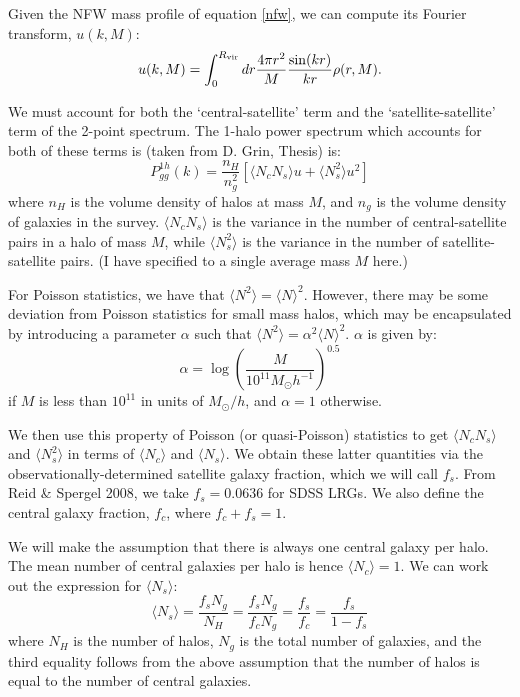 \documentclass[onecolumn,amsmath,aps,fleqn, superscriptaddress]{revtex4}
\begin{document}
Given the NFW mass profile of equation \ref{nfw}, we can compute its Fourier transform, $u(k, M)$:
\begin{equation}
u(k, M) = \int_0^{R_{\rm vir}} dr \frac{4 \pi r^2}{M}\frac{\sin(kr)}{kr}\rho(r, M).
\label{u}
\end{equation}

We must account for both the `central-satellite' term and the `satellite-satellite' term of the 2-point spectrum. The 1-halo power spectrum which accounts for both of these terms is (taken from D. Grin, Thesis) is:
\begin{equation}
P_{gg}^{1h}(k) = \frac{n_H}{n_g^2}\left[\langle N_c N_s \rangle u + \langle N_s^2 \rangle u^2\right]
\label{1hpgg}
\end{equation}
where $n_H$ is the volume density of halos at mass $M$, and $n_g$ is the volume density of galaxies in the survey. $\langle N_c N_s \rangle$ is the variance in the number of central-satellite pairs in a halo of mass $M$, while $\langle N_s^2 \rangle$ is the variance in the number of satellite-satellite pairs. (I have specified to a single average mass $M$ here.) 

For Poisson statistics, we have that $\langle N^2 \rangle = \langle N \rangle^2$. However, there may be some deviation from Poisson statistics for small mass halos, which may be encapsulated by introducing a parameter $\alpha$ such that $\langle N^2 \rangle = \alpha^2\langle N \rangle^2$. $\alpha$ is given by:
\begin{equation}
\alpha = \log\left(\frac{M}{10^{11}M_\odot h^{-1}}\right)^{0.5}
\label{alpha}
\end{equation}
if $M$ is less than $10^{11}$ in units of $M_\odot / h$, and $\alpha=1$ otherwise. 

We then use this property of Poisson (or quasi-Poisson) statistics to get $\langle N_c N_s \rangle$ and $\langle N_s^2 \rangle$ in terms of $\langle N_c \rangle$ and $\langle N_s \rangle$. We obtain these latter quantities via the observationally-determined satellite galaxy fraction, which we will call $f_s$. From Reid \& Spergel 2008, we take $f_s = 0.0636$ for SDSS LRGs. We also define the central galaxy fraction, $f_c$, where $f_c + f_s=1$. 

We will make the assumption that there is always one central galaxy per halo. The mean number of central galaxies per halo is hence $\langle N_c \rangle=1$. We can work out the expression for $\langle N_s \rangle$:
\begin{equation}
\langle N_s \rangle = \frac{f_s N_g}{N_H} = \frac{f_s N_g}{f_c N_g} = \frac{f_s}{f_c} = \frac{f_s}{1-f_s}
\label{Nsmean}
\end{equation}
where $N_H$ is the number of halos, $N_g$ is the total number of galaxies, and the third equality follows from the above assumption that the number of halos is equal to the number of central galaxies.
\end{document}
